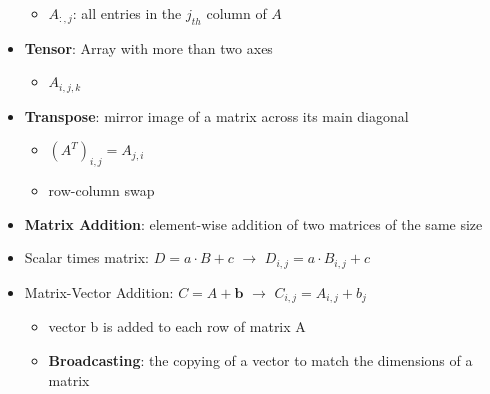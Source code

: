 \begin{itemize}
\begin{itemize}
        \item $A_{:, j}$: all entries in the $j_{th}$ column of $A$
    \end{itemize}
    \item \textbf{Tensor}: Array with more than two axes
    \begin{itemize}
        \item $A_{i, j, k}$
    \end{itemize}
    \item \textbf{Transpose}: mirror image of a matrix across its main diagonal
    \begin{itemize}
        \item $(A^T)_{i,j} = A_{j, i}$
        \item row-column swap
    \end{itemize}
    \item \textbf{Matrix Addition}: element-wise addition of two matrices of the same size
    \item Scalar times matrix: $D = a \cdot B + c$ $\rightarrow$ $D_{i,j} = a \cdot B_{i,j} + c$ 
    \item Matrix-Vector Addition: $C = A + \mathbf{b}$ $\rightarrow$  $C_{i, j} = A_{i, j} + b_j$
    \begin{itemize}
        \item vector b is added to each row of matrix A
        \item \textbf{Broadcasting}: the copying of a vector to match the dimensions of a matrix
    \end{itemize}
\end{itemize}
